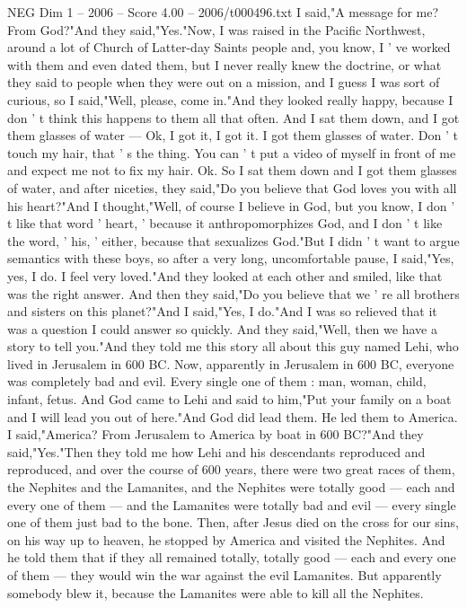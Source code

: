 \begin{textsample}{NEG Dim 1 – 2006 – Score 4.00 – 2006/t000496.txt}
I said,"A message for me?
From God?"And they said,"Yes."Now, I was raised in the Pacific Northwest, around a lot of Church of Latter-day Saints people and, you know, I ' ve worked with them and even dated them, but I never really knew the doctrine, or what they said to people when they were out on a mission, and I guess I was sort of curious, so I said,"Well, please, come in."And they looked really happy, because I don ' t think this happens to them all that often.
And I sat them down, and I got them glasses of water — Ok, I got it, I got it.
I got them glasses of water.
Don ' t touch my hair, that ' s the thing.
You can ' t put a video of myself in front of me and expect me not to fix my hair.
Ok.
So I sat them down and I got them glasses of water, and after niceties, they said,"Do you believe that God loves you with all his heart?"And I thought,"Well, of course I believe in God, but you know, I don ' t like that word ' heart, ' because it anthropomorphizes God, and I don ' t like the word, ' his, ' either, because that sexualizes God."But I didn ' t want to argue semantics with these boys, so after a very long, uncomfortable pause, I said,"Yes, yes, I do.
I feel very loved."And they looked at each other and smiled, like that was the right answer.
And then they said,"Do you believe that we ' re all brothers and sisters on this planet?"And I said,"Yes, I do."And I was so relieved that it was a question I could answer so quickly.
And they said,"Well, then we have a story to tell you."And they told me this story all about this guy named Lehi, who lived in Jerusalem in 600 BC.
Now, apparently in Jerusalem in 600 BC, everyone was completely bad and evil.
Every single one of them : man, woman, child, infant, fetus.
And God came to Lehi and said to him,"Put your family on a boat and I will lead you out of here."And God did lead them.
He led them to America.
I said,"America?
From Jerusalem to America by boat in 600 BC?"And they said,"Yes."Then they told me how Lehi and his descendants reproduced and reproduced, and over the course of 600 years, there were two great races of them, the Nephites and the Lamanites, and the Nephites were totally good — each and every one of them — and the Lamanites were totally bad and evil — every single one of them just bad to the bone.
Then, after Jesus died on the cross for our sins, on his way up to heaven, he stopped by America and visited the Nephites.
And he told them that if they all remained totally, totally good — each and every one of them — they would win the war against the evil Lamanites.
But apparently somebody blew it, because the Lamanites were able to kill all the Nephites.

\end{textsample}
